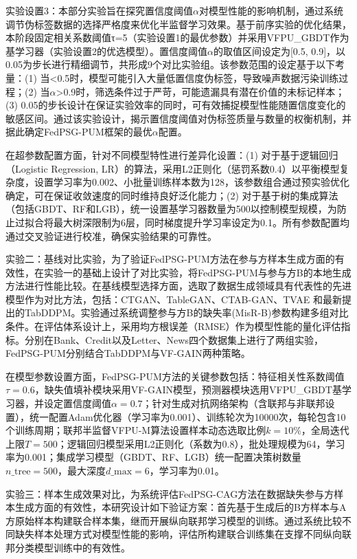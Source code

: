 实验设置3：本部分实验旨在探究置信度阈值$\alpha$对模型性能的影响机制，通过系统调节伪标签数据的选择严格度来优化半监督学习效果。基于前序实验的优化结果，本阶段固定相关系数阈值τ=5（实验设置1的最优参数）并采用VFPU\_GBDT作为基学习器（实验设置2的优选模型）。置信度阈值$\alpha$的取值区间设定为[0.5, 0.9]，以0.05为步长进行精细调节，共形成9个对比实验组。该参数范围的设定基于以下考量：(1) 当<0.5时，模型可能引入大量低置信度伪标签，导致噪声数据污染训练过程；(2) 当$\alpha$>0.9时，筛选条件过于严苛，可能遗漏具有潜在价值的未标记样本；(3) 0.05的步长设计在保证实验效率的同时，可有效捕捉模型性能随置信度变化的敏感区间。通过该实验设计，揭示置信度阈值对伪标签质量与数量的权衡机制，并据此确定FedPSG-PUM框架的最优$\alpha$配置。

在超参数配置方面，针对不同模型特性进行差异化设置：(1) 对于基于逻辑回归（Logistic Regression, LR）的算法，采用L2正则化（惩罚系数0.4）以平衡模型复杂度，设置学习率为0.002、小批量训练样本数为128，该参数组合通过预实验优化确定，可在保证收敛速度的同时维持良好泛化能力；(2) 对于基于树的集成算法（包括GBDT、RF和LGB），统一设置基学习器数量为500以控制模型规模，为防止过拟合将最大树深限制为6层，同时梯度提升学习率设定为0.1。所有参数配置均通过交叉验证进行校准，确保实验结果的可靠性。

实验二：基线对比实验，为了验证FedPSG-PUM方法在参与方样本生成方面的有效性，在实验一的基础上设计了对比实验，将FedPSG-PUM与参与方B的本地生成方法进行性能比较。在基线模型选择方面，选取了数据生成领域具有代表性的先进模型作为对比方法，包括：CTGAN、TableGAN、CTAB-GAN、TVAE 和最新提出的TabDDPM。实验通过系统调整参与方B的缺失率(MisR-B)参数构建多组对比条件。在评估体系设计上，采用均方根误差（RMSE）作为模型性能的量化评估指标。分别在Bank、Credit以及Letter、News四个数据集上进行了两组实验，FedPSG-PUM分别结合TabDDPM与VF-GAIN两种策略。

在模型参数设置方面，FedPSG-PUM方法的关键参数包括：特征相关性系数阈值$\tau=0.6$，缺失值填补模块采用VF-GAIN模型，预测器模块选用VFPU\_GBDT基学习器，并设定置信度阈值$\alpha=0.7$；针对生成对抗网络架构（含联邦与非联邦设置），统一配置Adam优化器（学习率为0.001）、训练轮次为10000次，每轮包含10个训练周期；联邦半监督VFPU-M算法设置样本动态选取比例$k=10\%$，全局迭代上限$T=500$；逻辑回归模型采用L2正则化（系数为0.8），批处理规模为64，学习率为0.001；集成学习模型（GBDT、RF、LGB）统一配置决策树数量$n\_{\text{tree}}=500$，最大深度$d\_{\text{max}}=6$，学习率为0.01。

实验三：样本生成效果对比，为系统评估FedPSG-CAG方法在数据缺失参与方样本生成方面的有效性，本研究设计如下验证方案：首先基于生成后的B方样本与A方原始样本构建联合样本集，继而开展纵向联邦学习模型的训练。通过系统比较不同缺失样本处理方式对模型性能的影响，评估所构建联合训练集在支撑不同纵向联邦分类模型训练中的有效性。

